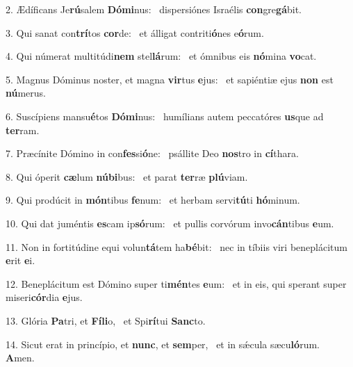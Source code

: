 2. Ædíficans Je\textbf{rú}salem \textbf{Dó}\textbf{mi}nus: \ast\  dispersiónes Israélis \textbf{con}gre\textbf{gá}bit.\

3. Qui sanat con\textbf{trí}tos \textbf{cor}de: \ast\  et álligat contriti\textbf{ó}nes e\textbf{ó}rum.\

4. Qui númerat multitúdi\textbf{nem} stel\textbf{lá}rum: \ast\  et ómnibus eis \textbf{nó}mina \textbf{vo}cat.\

5. Magnus Dóminus noster, et magna \textbf{vir}tus \textbf{e}jus: \ast\  et sapiéntiæ ejus \textbf{non} est \textbf{nú}merus.\

6. Suscípiens mansu\textbf{é}tos \textbf{Dó}\textbf{mi}nus: \ast\  humílians autem peccatóres \textbf{us}que ad \textbf{ter}ram.\

7. Præcínite Dómino in con\textbf{fes}si\textbf{ó}ne: \ast\  psállite Deo \textbf{nos}tro in \textbf{cí}thara.\

8. Qui óperit \textbf{cæ}lum \textbf{nú}\textbf{bi}bus: \ast\  et parat \textbf{ter}ræ \textbf{plú}viam.\

9. Qui prodúcit in \textbf{món}tibus \textbf{fe}num: \ast\  et herbam servi\textbf{tú}ti \textbf{hó}minum.\

10. Qui dat juméntis \textbf{es}cam ip\textbf{só}rum: \ast\  et pullis corvórum invo\textbf{cán}tibus \textbf{e}um.\

11. Non in fortitúdine equi volun\textbf{tá}tem ha\textbf{bé}bit: \ast\  nec in tíbiis viri beneplácitum \textbf{e}rit \textbf{e}i.\

12. Beneplácitum est Dómino super ti\textbf{mén}tes \textbf{e}um: \ast\  et in eis, qui sperant super miseri\textbf{cór}dia \textbf{e}jus.\

13. Glória \textbf{Pa}tri, et \textbf{Fí}\textbf{li}o, \ast\  et Spi\textbf{rí}tui \textbf{Sanc}to.\

14. Sicut erat in princípio, et \textbf{nunc}, et \textbf{sem}per, \ast\  et in sǽcula sæcu\textbf{ló}rum. \textbf{A}men.\

